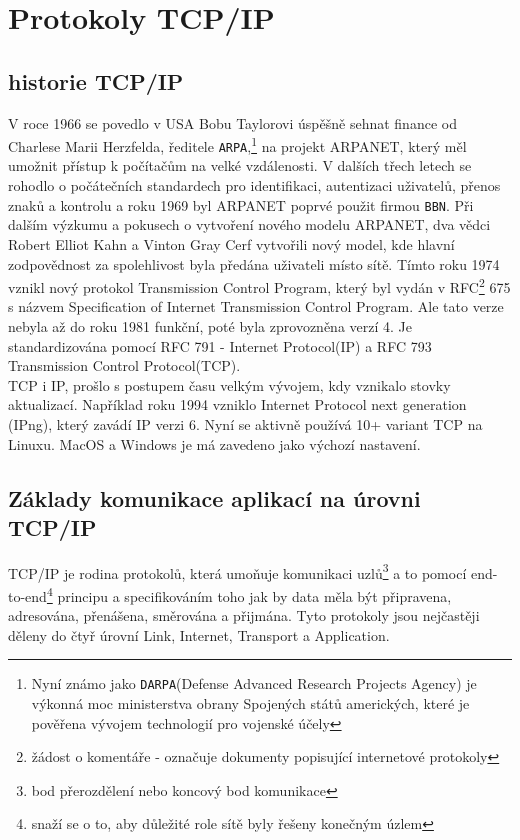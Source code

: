 \documentclass[12pt]{report}			%
\begin{document}
		\chapter{Protokoly TCP/IP}
			
			\section{historie TCP/IP}
				V roce 1966 se povedlo v USA Bobu Taylorovi úspěšně sehnat finance od Charlese Marii Herzfelda, ředitele \texttt{ARPA},\footnote{Nyní známo jako \texttt{DARPA}(Defense Advanced Research Projects Agency) je výkonná moc ministerstva obrany Spojených států amerických, které je pověřena vývojem technologií pro vojenské účely} na projekt ARPANET, který měl umožnit přístup k počítačům na velké vzdálenosti. V dalších třech letech se rohodlo o počátečních standardech pro identifikaci, autentizaci uživatelů, přenos znaků a kontrolu a roku 1969 byl ARPANET poprvé použit firmou \texttt{BBN}. 
Při dalším výzkumu a pokusech o vytvoření nového modelu ARPANET, dva vědci Robert Elliot Kahn a Vinton Gray Cerf vytvořili nový model, kde hlavní zodpovědnost za spolehlivost byla předána uživateli místo sítě. Tímto roku 1974 vznikl nový protokol Transmission Control Program, který byl vydán v RFC\footnote{žádost o komentáře - označuje dokumenty popisující internetové protokoly} 675 s názvem Specification of Internet Transmission Control Program. Ale tato verze nebyla až do roku 1981 funkční, poté byla zprovozněna verzí 4. Je standardizována pomocí RFC 791 - Internet Protocol(IP) a RFC 793 Transmission Control Protocol(TCP). 
\\
TCP i IP, prošlo s postupem času velkým vývojem, kdy vznikalo stovky aktualizací. Například roku 1994 vzniklo Internet Protocol next generation (IPng), který zavádí IP verzi 6. Nyní se aktivně používá 10+ variant TCP na Linuxu. MacOS a Windows je má zavedeno jako výchozí nastavení. \cite{History3} \cite{ARPNET} \cite{History2} \cite{History} \cite{Rules} \cite{IP} \cite{TCP}  

			\section{Základy komunikace aplikací na úrovni TCP/IP }
			TCP/IP je rodina protokolů, která umoňuje komunikaci uzlů\footnote{bod přerozdělení nebo koncový bod komunikace} a to pomocí end-to-end\footnote{snaží se o to, aby důležité role sítě byly řešeny konečným úzlem} principu a specifikováním toho jak by data měla být připravena, adresována, přenášena, směrována a přijmána. Tyto protokoly jsou nejčastěji děleny do čtyř úrovní Link, Internet, Transport a Application. \cite{zakladykomunikace1}\cite{zakladykomunikace2}\cite{zakladykomunikace3}
			
\end{document}
